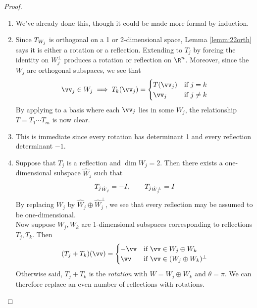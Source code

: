 \begin{proof}
\begin{enumerate}
  \item We've already done this, though it could be made more formal by induction.
  \item Since $T_{W_j}$ is orthogonal on a 1 or 2-dimensional space, Lemma \ref{lemm:22orth} says it is either a rotation or a reflection. Extending to $T_j$ by forcing the identity on $W_j^\perp$ produces a rotation or reflection on $\R^n$. Moreover, since the $W_j$ are orthogonal subspaces, we see that
  \[\vv_j\in W_j\implies T_k(\vv_j)=\begin{cases}
  T(\vv_j)&\text{if $j=k$}\\
  \vv_j&\text{if $j\neq k$}
  \end{cases}\]
  By applying to a basis where each $\vv_j$ lies in some $W_j$, the relationship $T=T_1\cdots T_m$ is now clear.
  \item This is immediate since every rotation has determinant 1 and every reflection determinant $-1$.
  \item Suppose that $T_j$ is a reflection and $\dim W_j=2$. Then there exists a one-dimensional subspace $\hat W_j$ such that
  \[{T_j}_{{\hat W_j}}=-I,\qquad {T_j}_{{\hat W_j^\perp}}=I\]
  By replacing $W_j$ by $\hat W_j\oplus \hat W_j^\perp$, we see that every reflection may be assumed to be one-dimensional.\\
  Now suppose $W_j,W_k$ are 1-dimensional subspaces corresponding to reflections $T_j,T_k$. Then
  \[(T_j+T_k)(\vv)=\begin{cases}
  -\vv&\text{if $\vv\in W_j\oplus W_k$}\\
  \vv&\text{if $\vv\in (W_j\oplus W_k)^\perp$}
  \end{cases}\]
  Otherwise said, $T_j+T_k$ is the \emph{rotation} with $W=W_j\oplus W_k$ and $\theta=\pi$. We can therefore replace an even number of reflections with rotations.\qedhere
\end{enumerate}
\end{proof}




